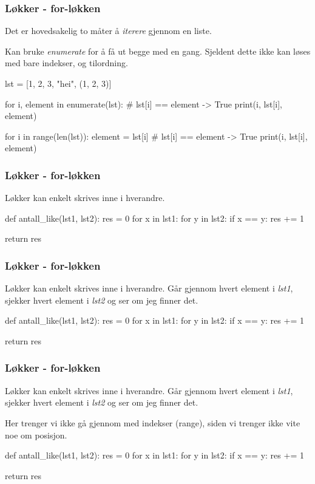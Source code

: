 \begin{frame}[fragile]
    \frametitle{Løkker - for-løkken}

    Det er hovedsakelig to måter å \textit{iterere} gjennom en liste. 

    Kan bruke \textit{enumerate} for å få ut begge med en gang. Sjeldent dette ikke kan løses med bare indekser, og tilordning. 

\begin{python}
lst = [1, 2, 3, "hei", (1, 2, 3)]

for i, element in enumerate(lst): 
    # lst[i] == element -> True
    print(i, lst[i], element)

for i in range(len(lst)):
    element = lst[i]
    # lst[i] == element -> True
    print(i, lst[i], element)
\end{python}

\end{frame}

\begin{frame}[fragile]
    \frametitle{Løkker - for-løkken}

    Løkker kan enkelt skrives inne i hverandre. 

\begin{python}
def antall_like(lst1, lst2):
    res = 0
    for x in lst1: 
        for y in lst2:
            if x == y: 
                res += 1
    
    return res
\end{python}

\end{frame}

\begin{frame}[fragile]
    \frametitle{Løkker - for-løkken}

    Løkker kan enkelt skrives inne i hverandre. Går gjennom hvert element i \textit{lst1}, sjekker hvert element i \textit{lst2} og ser om jeg finner det. 

\begin{python}
def antall_like(lst1, lst2):
    res = 0
    for x in lst1: 
        for y in lst2:
            if x == y: 
                res += 1
    
    return res
\end{python}

\end{frame}

\begin{frame}[fragile]
    \frametitle{Løkker - for-løkken}

    Løkker kan enkelt skrives inne i hverandre. Går gjennom hvert element i \textit{lst1}, sjekker hvert element i \textit{lst2} og ser om jeg finner det. 

    Her trenger vi ikke gå gjennom med indekser (range), siden vi trenger ikke vite noe om posisjon. 

\begin{python}
def antall_like(lst1, lst2):
    res = 0
    for x in lst1: 
        for y in lst2:
            if x == y: 
                res += 1
    
    return res
\end{python}

\end{frame}

